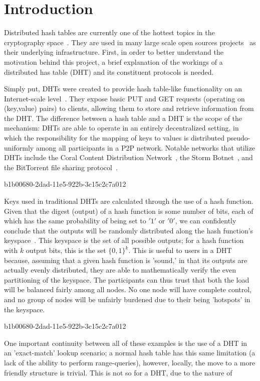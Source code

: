 \documentclass[12pt]{article}
\begin{document}
\section{Introduction}
\par Distributed hash tables are currently one of the hottest topics in the cryptography space~\cite{Stoica:2001dj,Rowstron:2001ea,Ratnasamy:2001wn}. They are used in many large scale open sources projects~\cite{Freitas:2013tb,Xu:2010vs,Perfitt:2010fh} as their underlying infrastructure. First, in order to better understand the motivation behind this project, a brief explanation of the workings of a distributed has table (DHT) and its constituent protocols is needed.

\par Simply put, DHTs were created to provide hash table-like functionality on an Internet-scale level~\cite{Ratnasamy:2001wn}. They expose basic PUT and GET requests (operating on (key,value) pairs) to clients, allowing them to store and retrieve information from the DHT. The difference between a hash table and a DHT is the scope of the mechanism: DHTs are able to operate in an entirely decentralized setting, in which the responsibility for the mapping of keys to values is distributed pseudo-uniformly among all participants in a P2P network. Notable networks that utilize DHTs include the Coral Content Distribution Network~\cite{Freedman:2004vb}, the Storm Botnet~\cite{Holz:2008uk}, and the BitTorrent file sharing protocol~\cite{Cohen:y1_8mBnw}.

b1b00680-2dad-11e5-922b-3c15c2c7a012\par Keys used in traditional DHTs are calculated through the use of a hash function. Given that the digest (output) of a hash function is some number of bits, each of which has the same probability of being set to $'1'$ or $'0'$, we can confidently conclude that the outputs will be randomly distributed along the hash function's keyspace~. This keyspace is the set of all possible outputs; for a hash function with $k$ output bits, this is the set $\{0,1\}^k$. This is useful to users in a DHT because, assuming that a given hash function is 'sound,' in that its outputs are actually evenly distributed, they are able to mathematically verify the even partitioning of the keyspace. The participants can thus trust that both the load will be balanced fairly among all nodes. No one node will have complete control, and no group of nodes will be unfairly burdened due to their being 'hotspots' in the keyspace.~

b1b00680-2dad-11e5-922b-3c15c2c7a012\par One important continuity between all of these examples is the use of a DHT in an 'exact-match' lookup scenario; a normal hash table has this same limitation (a lack of the ability to perform range-queries), however, locally, the move to a more friendly structure is trivial. This is not so for a DHT, due to the nature of
\printbibliography
\end{document}
